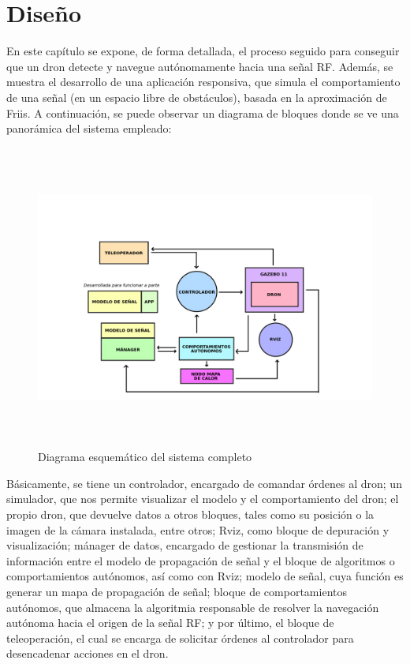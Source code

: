 \chapter{Diseño}
\label{cap:capitulo4}

En este capítulo se expone, de forma detallada, el proceso seguido para conseguir que un dron detecte y navegue autónomamente hacia una señal \ac{RF}. Además, se muestra el desarrollo de una aplicación responsiva, que simula el comportamiento de una señal (en un espacio libre de obstáculos), basada en la aproximación de Friis. A continuación, se puede observar un diagrama de bloques donde se ve una panorámica del sistema empleado:

\begin{figure} [H]
	\begin{center}
	\includegraphics[height=10cm]{imagenes/cap4/0_diagrama_general.png}
	\end{center}
	\caption[Diagrama esquemático del sistema completo]{Diagrama esquemático del sistema completo}
	\label{fig:diagrama}
\end{figure}

Básicamente, se tiene un controlador, encargado de comandar órdenes al dron; un simulador, que nos permite visualizar el modelo y el comportamiento del dron; el propio dron, que devuelve datos a otros bloques, tales como su posición o la imagen de la cámara instalada, entre otros; Rviz, como bloque de depuración y visualización; mánager de datos, encargado de gestionar la transmisión de información entre el modelo de propagación de señal y el bloque de algoritmos o comportamientos autónomos, así como con Rviz; modelo de señal, cuya función es generar un mapa de propagación de señal; bloque de comportamientos autónomos, que almacena la algoritmia responsable de resolver la navegación autónoma hacia el origen de la señal \ac{RF}; y por último, el bloque de teleoperación, el cual se encarga de solicitar órdenes al controlador para desencadenar acciones en el dron.

